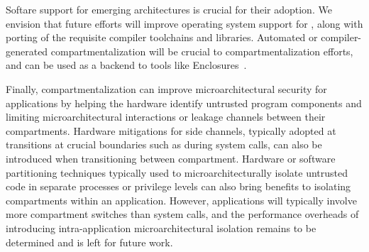 Softare support for emerging architectures is crucial for their adoption.
We envision that future efforts will improve operating system support for
\seccells, along with porting of the requisite compiler toolchains and
libraries.
Automated or compiler-generated compartmentalization will be crucial to
compartmentalization efforts, and \seccells can be used as a backend to
tools like Enclosures~\cite{GhosnKPLB21}.

Finally, compartmentalization can improve microarchitectural security for
applications by helping the hardware identify untrusted program components
and limiting microarchitectural interactions or leakage channels between
their compartments.
Hardware mitigations for side channels, typically adopted at transitions
at crucial boundaries such as during system calls, can also be introduced
when transitioning between compartment.
Hardware or software partitioning techniques typically used to 
microarchitecturally isolate untrusted code in separate processes or privilege
levels can also bring benefits to isolating compartments within an application.
However, applications will typically involve more compartment switches than 
system calls, and the performance overheads of introducing intra-application
microarchitectural isolation remains to be determined and is left for future
work.
